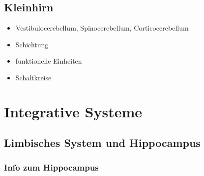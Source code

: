 \documentclass[12pt,a4paper,pdftex]{article}
\begin{document}
\subsection{Kleinhirn}
\begin{itemize}
    \item Vestibulocerebellum, Spinocerebellum, Corticocerebellum 
    \item Schichtung
    \item funktionelle Einheiten
    \item Schaltkreise
\end{itemize}


\newpage
\section{Integrative Systeme} \label{sec:integrative_systeme}
\subsection{Limbisches System und Hippocampus}

\subsubsection*{Info zum Hippocampus}
\end{document}
